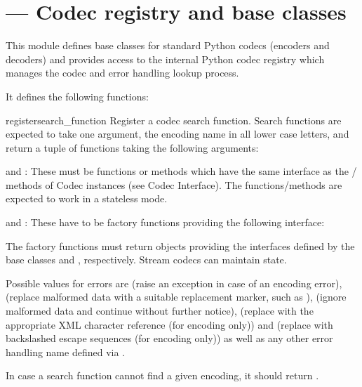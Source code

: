\section{ ---
         Codec registry and base classes}




This module defines base classes for standard Python codecs (encoders
and decoders) and provides access to the internal Python codec
registry which manages the codec and error handling lookup process.

It defines the following functions:

\begin{funcdesc}{register}{search_function}
Register a codec search function. Search functions are expected to
take one argument, the encoding name in all lower case letters, and
return a tuple of functions  taking the following arguments:

   and : These must be functions or methods
  which have the same interface as the
  / methods of Codec instances (see
  Codec Interface). The functions/methods are expected to work in a
  stateless mode.

   and : These have to be
  factory functions providing the following interface:


  The factory functions must return objects providing the interfaces
  defined by the base classes  and
  , respectively. Stream codecs can maintain
  state.

  Possible values for errors are  (raise an exception
  in case of an encoding error),  (replace malformed
  data with a suitable replacement marker, such as ),
   (ignore malformed data and continue without further
  notice),  (replace with the appropriate XML
  character reference (for encoding only)) and 
  (replace with backslashed escape sequences (for encoding only)) as
  well as any other error handling name defined via
  .

In case a search function cannot find a given encoding, it should
return .
\end{funcdesc}

